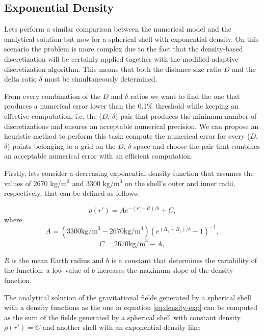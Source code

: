 \documentclass[extra]{gji}
\begin{document}
\subsection{Exponential Density}

Lets perform a similar comparison between the numerical model and 
the analytical solution but now for a spherical shell with exponential 
density.
On this scenario the problem is more complex due to the fact that the 
density-based discretization will be certainly applied together with 
the modified adaptive discretization algorithm.
This means that both the distance-size ratio $D$ and the delta ratio 
$\delta$ must be simultaneously determined.

From every combination of the $D$ and $\delta$ ratios we want to find 
the one that produces a numerical error lower than the 0.1\% threshold 
while keeping an effective computation, i.e. the ($D$, $\delta)$ pair 
that produces the minimum number of discretizations and ensures an 
acceptable numerical precision.
We can propose an heuristic method to perform this task: compute the 
numerical error for every ($D$, $\delta$) points belonging to a grid on 
the $D$, $\delta$ space and choose the pair that combines an 
acceptable numerical error with an efficient computation.

Firstly, lets consider a decreasing exponential density function that 
assumes the values of 2670 kg/m$^3$ and 3300 kg/m$^3$ on the shell's 
outer and inner radii, respectively, that can be defined as follows:

\begin{equation}
    \rho(r') = A e^{-(r' - R)/b} + C,
\label{eq:density-exp}
\end{equation}
\noindent where
\begin{equation}
    A =
    (3300 \text{kg/m}^3 - 2670 \text{kg/m}^3)
    \left( e^{( R_2 - R_1 )/b} - 1 \right)^{-1},
\end{equation}
\begin{equation}
    C =
    2670 \text{kg/m}^3 - A,
\end{equation}

\noindent $R$ is the mean Earth radius and $b$ is a constant 
that determines the variability of the function: a low value of $b$ 
increases the maximum slope of the density function.

The analytical solution of the gravitational fields generated 
by a spherical shell with a density functions as the one in equation 
\ref{eq:density-exp} can be computed as the sum of the fields generated 
by a spherical shell with constant density $\rho(r') = C$ and another 
shell with an exponential density like:
\end{document}
